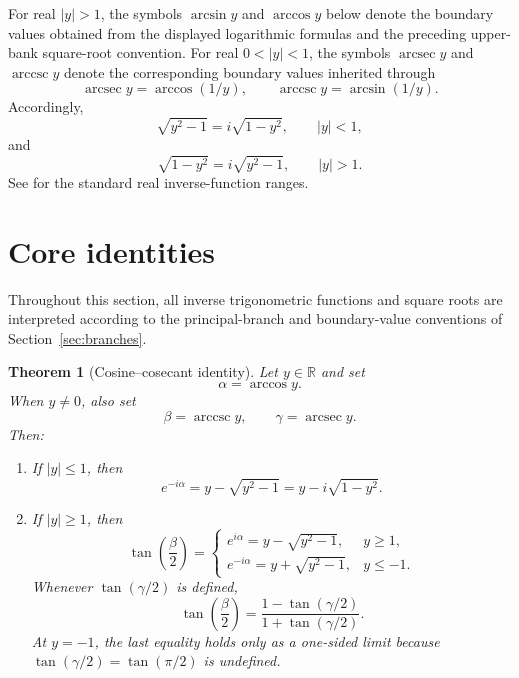 \documentclass[11pt]{article}
\newtheorem{theorem}{Theorem}[section]
\theoremstyle{remark}
\DeclareMathOperator{\arccsc}{arccsc}
\DeclareMathOperator{\arcsec}{arcsec}
\begin{document}
For real $|y|>1$, the symbols $\arcsin y$ and $\arccos y$ below denote the boundary values obtained from the displayed logarithmic formulas and the preceding upper-bank square-root convention. For real $0<|y|<1$, the symbols $\arcsec y$ and $\arccsc y$ denote the corresponding boundary values inherited through
\[
\arcsec y=\arccos(1/y),
\qquad
\arccsc y=\arcsin(1/y).
\]
Accordingly,
\[
\sqrt{y^2-1}=i\sqrt{1-y^2},\qquad |y|<1,
\]
and
\[
\sqrt{1-y^2}=i\sqrt{y^2-1},\qquad |y|>1.
\]
See \cite[\S4.4]{AbramowitzStegun} for the standard real inverse-function ranges.

\section{Core identities}

Throughout this section, all inverse trigonometric functions and square
roots are interpreted according to the principal-branch and boundary-value
conventions of Section~\ref{sec:branches}.

\begin{theorem}[Cosine--cosecant identity]
\label{thm:cos-csc}
Let \(y\in\mathbb R\) and set
\[
\alpha=\arccos y.
\]
When \(y\ne0\), also set
\[
\beta=\arccsc y,
\qquad
\gamma=\arcsec y.
\]
Then:
\begin{enumerate}[label=\arabic*.]
\item If \(|y|\le1\), then
\[
e^{-i\alpha}
=y-\sqrt{y^2-1}
=y-i\sqrt{1-y^2}.
\]

\item If \(|y|\ge1\), then
\[
\tan\!\left(\frac{\beta}{2}\right)
=
\begin{cases}
e^{i\alpha}
=y-\sqrt{y^2-1},
& y\ge1,\\[2mm]
e^{-i\alpha}
=y+\sqrt{y^2-1},
& y\le-1.
\end{cases}
\]
Whenever \(\tan(\gamma/2)\) is defined,
\[
\tan\!\left(\frac{\beta}{2}\right)
=
\frac{1-\tan(\gamma/2)}
     {1+\tan(\gamma/2)}.
\]
At \(y=-1\), the last equality holds only as a one-sided limit because
\(\tan(\gamma/2)=\tan(\pi/2)\) is undefined.
\end{enumerate}
\end{theorem}
\end{document}
